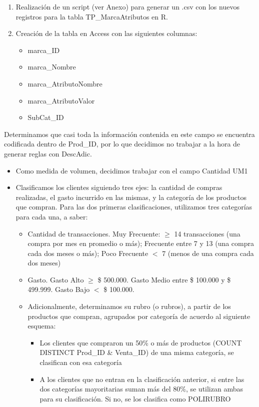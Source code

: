 \documentclass[]{article}
\begin{document}
\begin{itemize}
\begin{enumerate}
			\item Realización de un script (ver Anexo) para generar un .csv con los nuevos registros para la tabla TP\_MarcaAtributos en R.
			
			\item Creación de la tabla en Access con las siguientes columnas:
			\begin{itemize}
				\item marca\_ID
				\item marca\_Nombre
				\item marca\_AtributoNombre
				\item marca\_AtributoValor
				\item SubCat\_ID	
			\end{itemize}	
			
		\end{enumerate}
		
		
	\end{itemize}
	
	
	
	Determinamos que casi toda la información contenida en este campo se encuentra codificada dentro de Prod\_ID, por lo que decidimos no trabajar a la hora de generar reglas con DescAdic.\\
	
	\begin{itemize}
		\item Como medida de volumen, decidimos trabajar con el campo Cantidad UM1
		\item Clasificamos los clientes siguiendo tres ejes: la cantidad de compras realizadas, el gasto incurrido en las mismas, y la categoría de los productos que compran. Para las dos primeras clasificaciones, utilizamos tres categorías para cada una, a saber:
		
		\begin{itemize}
			\item Cantidad de transacciones. Muy Frecuente: $\geq$ 14 transacciones (una compra por mes en promedio o más); Frecuente entre 7 y 13 (una compra cada dos meses o más); Poco Frecuente $<$ 7 (menos de una compra cada dos meses)
			\item Gasto. Gasto Alto $\geq$ \$ 500.000. Gasto Medio entre \$ 100.000 y \$ 499.999. Gasto Bajo $<$ \$ 100.000.
			\item Adicionalmente, determinamos su rubro (o rubros), a partir de los productos que compran, agrupados por categoría de acuerdo al siguiente esquema:
			\begin{itemize}
				\item Los clientes que compraron un 50\% o más de productos (COUNT DISTINCT Prod\_ID \& Venta\_ID) de una misma categoría, se clasifican con esa categoría
				
				\item A los clientes que no entran en la clasificación anterior, si entre las dos categorías mayoritarias suman más del 80\%, se utilizan ambas para su clasificación. Si no, se los clasifica como POLIRUBRO
			\end{itemize}
		\end{itemize}
		
	\end{itemize}
	
\end{document}
